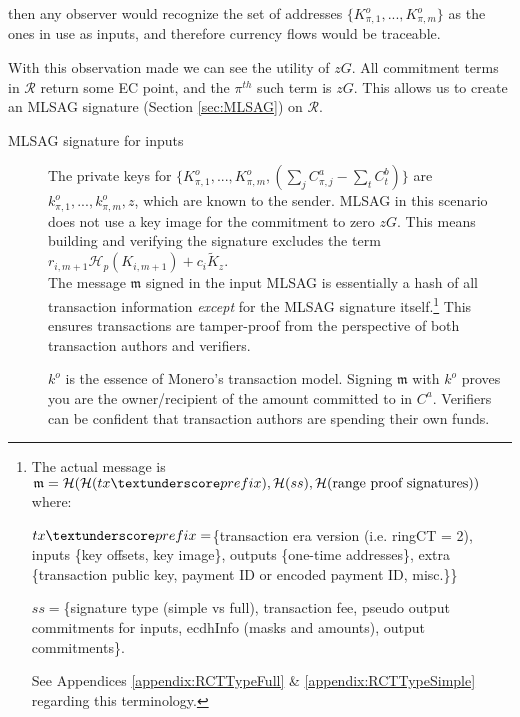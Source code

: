 then any observer would recognize the set of addresses
$\{K_{\pi,1}^o,...,K_{\pi,m}^o\}$
as the ones in use as inputs, and therefore currency flows would be traceable.

With this observation made we can see the utility of $z G$. All commitment terms in $\mathcal{R}$ return some EC point, and the $\pi^{th}$ such term is $z G$. This allows us to create an MLSAG signature (Section \ref{sec:MLSAG}) on $\mathcal{R}$.


\begin{description}%
	
	\item [MLSAG signature for inputs]
	The private keys for 
	\(\{K_{\pi,1}^o,...,K_{\pi,m}^o, (\sum\limits_j C_{\pi, j}^a - \sum\limits_t C^b_{t})\}\)
	are\\
	\( k_{\pi,1}^o,...,k_{\pi,m}^o, z \), which are known to the sender. 
	MLSAG in this scenario does not use a key image for the commitment to zero $z G$. This means building and verifying the signature excludes the term $r_{i,m+1} \mathcal{H}_p(K_{i,m+1}) + c_i \tilde{K}_z$.\\
	
	The message $\mathfrak{m}$ signed in the input MLSAG is essentially a hash of all transaction information {\em except} for the MLSAG signature itself.\footnote{\label{MLSAG_message}The actual message is $\mathfrak{m} = \mathcal{H}(\mathcal{H}(tx\textunderscore prefix),\mathcal{H}(ss),\mathcal{H}(\text{range proof signatures}))$ where:\par
	$tx\textunderscore prefix = $\{transaction era version (i.e. ringCT = 2), inputs \{key offsets, key image\}, outputs \{one-time addresses\}, extra \{transaction public key, payment ID or encoded payment ID, misc.\}\}\par
	$ss = $\{signature type (simple vs full), transaction fee, pseudo output commitments for inputs, ecdhInfo (masks and amounts), output commitments\}.\par
	See Appendices \ref{appendix:RCTTypeFull} \& \ref{appendix:RCTTypeSimple} regarding this terminology.} This ensures transactions are tamper-proof from the perspective of both transaction authors and verifiers.
	
	$k^o$ is the essence of Monero's transaction model. Signing $\mathfrak{m}$ with $k^o$ proves you are the owner/recipient of the amount committed to in $C^a$. Verifiers can be confident that transaction authors are spending their own funds.
	

\end{description}

